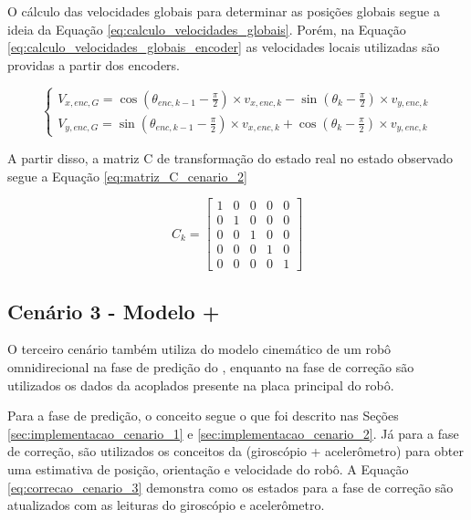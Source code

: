 \documentclass[acronym, symbols, table]{fei}
\begin{document}
			O cálculo das velocidades globais para determinar as posições globais segue a ideia da Equação \ref{eq:calculo_velocidades_globais}. Porém, na Equação \ref{eq:calculo_velocidades_globais_encoder} as velocidades locais utilizadas são providas a partir dos encoders.
			
				\begin{equation}\label{eq:calculo_velocidades_globais_encoder}
					\begin{cases}
						V_{x,enc,G} = \cos(\theta_{enc,k-1} - \frac{\pi}{2}) \times v_{x,enc,k} - \sin(\theta_{k} - \frac{\pi}{2}) \times v_{y,enc,k} \\
						V_{y,enc,G} = \sin(\theta_{enc,k-1} - \frac{\pi}{2}) \times v_{x,enc,k} + \cos(\theta_{k} - \frac{\pi}{2}) \times v_{y,enc,k}
					\end{cases}
				\end{equation}
			
			A partir disso, a matriz C de transformação do estado real no estado observado segue a Equação \ref{eq:matriz_C_cenario_2}
			
			\begin{equation}\label{eq:matriz_C_cenario_2}
				C_{k} = \begin{bmatrix}
					1 & 0 & 0 & 0 & 0 \\
					0 & 1 & 0 & 0 & 0 \\
					0 & 0 & 1 & 0 & 0 \\
					0 & 0 & 0 & 1 & 0 \\
					0 & 0 & 0 & 0 & 1
				\end{bmatrix}
			\end{equation}
		
		\subsection{Cenário 3 - Modelo + } \label{sec:implementacao_cenario_3}
		
			O terceiro cenário também utiliza do modelo cinemático de um robô omnidirecional na fase de predição do , enquanto na fase de correção são utilizados os dados da  acoplados presente na placa principal do robô.
			
			Para a fase de predição, o conceito segue o que foi descrito nas Seções \ref{sec:implementacao_cenario_1} e \ref{sec:implementacao_cenario_2}. Já para a fase de correção, são utilizados os conceitos da  (giroscópio + acelerômetro) para obter uma estimativa de posição, orientação e velocidade do robô. A Equação \ref{eq:correcao_cenario_3} demonstra como os estados para a fase de correção são atualizados com as leituras do giroscópio e acelerômetro.
			
\end{document}
